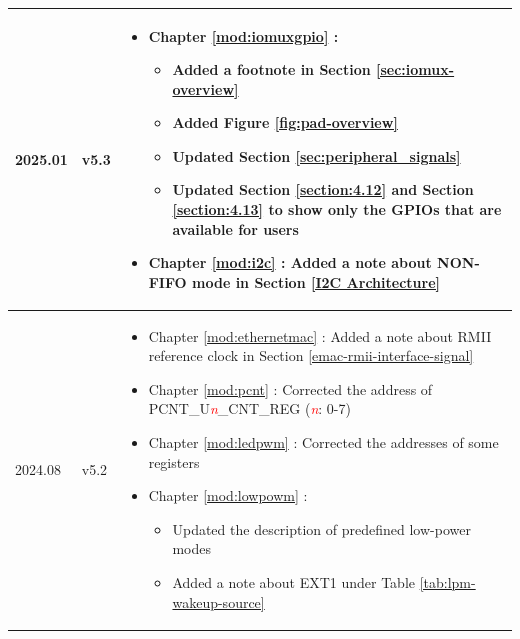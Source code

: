\begin{longtable}[l]{ | m{2cm} | m{1.5cm} | m{12cm} | }
2025.01 & v5.3 &
\vspace{0.5em}
 \begin{itemize}
    \item Chapter \ref{mod:iomuxgpio} \textit{\nameref{mod:iomuxgpio}}:
        \begin{itemize}
            \item Added a footnote in Section \ref{sec:iomux-overview} \textit{\nameref{sec:iomux-overview}} %
            \item Added Figure \ref{fig:pad-overview} \textit{\nameref{fig:pad-overview}} %
            \item Updated Section \ref{sec:peripheral_signals} \textit{\nameref{sec:peripheral_signals}} %
            \item Updated Section \ref{section:4.12} \textit{\nameref{section:4.12}} and Section \ref{section:4.13} \textit{\nameref{section:4.13}} to show only the GPIOs that are available for users %
        \end{itemize}
    \item Chapter \ref{mod:i2c} \textit{\nameref{mod:i2c}}: Added a note about NON-FIFO mode in Section \ref{I2C Architecture} \textit{\nameref{I2C Architecture}} %
    \end{itemize}
    \vspace{-1em}
    \\\hline
2024.08 & v5.2 &
\vspace{0.5em}
 \begin{itemize}
     \item Chapter \ref{mod:ethernetmac} \textit{\nameref{mod:ethernetmac}}: Added a note about RMII reference clock in Section \ref{emac-rmii-interface-signal} %
     \item Chapter \ref{mod:pcnt} \textit{\nameref{mod:pcnt}}: Corrected the address of PCNT\_U\textit{\textcolor{red}{\it{n}}}\_CNT\_REG (\textcolor{red}{\it{n}}: 0-7) %
     \item Chapter \ref{mod:ledpwm} \textit{\nameref{mod:ledpwm}}: Corrected the addresses of some registers %
     \item Chapter \ref{mod:lowpowm} \textit{\nameref{mod:lowpowm}}:
        \begin{itemize}
            \item Updated the description of predefined low-power modes %
            \item Added a note about EXT1 under Table \ref{tab:lpm-wakeup-source} %

\end{itemize}
\end{itemize}
\end{longtable}
